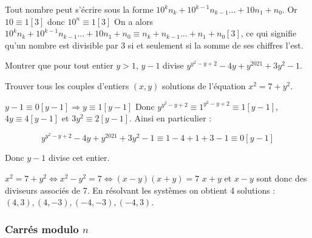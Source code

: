 \bigskip

\begin{ex}
Tout nombre peut s'écrire sous la forme $10^kn_k+10^{k-1}n_{k-1}...+10n_1+n_0$.
\newline
Or $10\equiv 1[3]$ donc $10^n\equiv 1[3]$
\newline
On a alors $10^kn_k+10^{k-1}n_{k-1}...+10n_1+n_0\equiv n_k+n_{k-1}...+n_1+n_0[3]$, ce qui signifie qu'un nombre est divisible par 3 si et seulement si la somme de ses chiffres l'est.
\end{ex}


\begin{exo}
Montrer que pour tout entier $y>1$, $y-1$ divise $y^{y^2-y+2}-4y+y^{2021}+3y^2-1$.
\end{exo}


\begin{exo}
Trouver tous les couples d'entiers $(x,y)$ solutions de l'équation $x^2=7+y^2$.
\end{exo}




\vspace{0.5cm}
\begin{sol}
$y-1\equiv 0[y-1] \Rightarrow y\equiv 1 [y-1]$ 
\newline Donc $y^{y^2-y+2}\equiv 1^{y^2-y+2}\equiv 1[y-1]$, $4y\equiv 4[y-1]$ et $3y^2\equiv 2 [y-1]$. 
\newline Ainsi en particulier :

$$y^{y^2-y+2}-4y+y^{2021}+3y^2-1\equiv 1-4+1+3-1\equiv 0[y-1]$$

Donc $y-1$ divise cet entier.
\end{sol}

\begin{sol}
$x^2=7+y^2 \iff x^2-y^2=7 \iff (x-y)(x+y)=7$
\newline $x+y$ et $x-y$ sont donc des diviseurs associés de 7.
\newline En résolvant les systèmes on obtient 4 solutions : $(4,3), (4,-3), (-4,-3), (-4,3)$.
\end{sol}

\bigskip


\subsubsection{Carrés modulo $n$}


